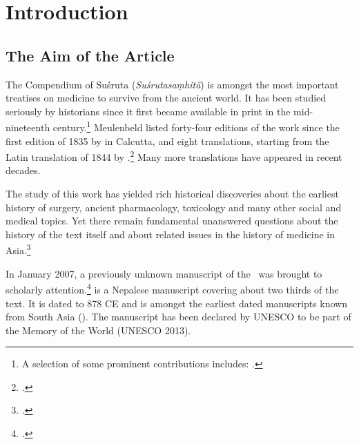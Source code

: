 \section{Introduction}

\subsection{The Aim of the Article}

The Compendium of Suśruta (\emph{Suśrutasaṃhitā}) is amongst the most
important treatises on medicine to survive from the ancient world. It has been
studied seriously by historians since it first became available in print in the
mid-nineteenth century.\footnote{A selection of some prominent contributions
includes: 
\cite{hoer-1897,hoer-1906a,hoer-1906b,hoer-1907a,hoer-1907,stra-1934,
sing-1972a,shar-1975, ray-1980, adri-1984,
yano-1986,meul-hist,shar-1999,vali-2007}.} %
 Meulenbeld listed
forty-four editions of the work since the first edition of 1835 by
\citeauthor{gupt-1835} in Calcutta, and eight translations,
starting from the Latin translation of 1844 by \citeauthor{hess-1855}.\footcite[IB, 
311\,ff.]{meul-hist}   Many more translations have appeared in recent decades.

The study of this work has yielded rich historical discoveries about 
the earliest history of surgery, ancient pharmacology, toxicology and many other 
social and medical topics. Yet there remain fundamental unanswered questions 
about the history of the text itself and about related issues in the history of 
medicine in Asia.\footcite[IA, 203–389]{meul-hist}

In January 2007, a previously unknown manuscript of the \SS\ was brought to 
scholarly attention.\footcite{dimi-kais}
  is a Nepalese 
manuscript covering about two thirds of the text. It is dated to 878 CE and is 
amongst the earliest dated manuscripts known from South Asia 
(\cite[87–88]{hari-2011}). The manuscript has been declared by UNESCO to be 
part of the Memory of the World (UNESCO 2013).


